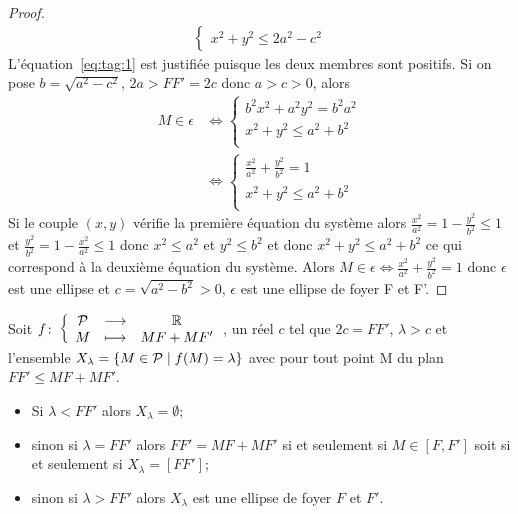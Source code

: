 \begin{proof}
\begin{align}
\begin{cases}
                   x^2+y^2 \leqslant 2a^2 -c^2\end{cases}
  \end{align}
  L'équation~\eqref{eq:tag:1} est justifiée puisque les deux membres sont 
  positifs. Si on  pose \(b=\sqrt{a^2-c^2}\), \(2a>FF'=2c\) donc \(a>c>0\), 
  alors
  \begin{align}
    M \in \epsilon & \iff \begin{cases} b^2x^2 +a^2y^2=b^2a^2 \\ x^2+y^2 
    \leqslant a^2 +b^2\\\end{cases}\\
                   & \iff \begin{cases} \frac{x^2}{a^2} +\frac{y^2}{b^2}=1\\ 
                   x^2+y^2 \leqslant a^2 +b^2 \\\end{cases}
  \end{align}
  Si le couple \((x,y)\) vérifie la première équation du système alors 
  \(\frac{x^2}{a^2}=1-\frac{y^2}{b^2}\leqslant 1\) et 
  \(\frac{y^2}{b^2}=1-\frac{x^2}{a^2} \leqslant 1\) donc \(x^2 \leqslant a^2\) 
  et \(y^2 \leqslant b^2\) et donc \(x^2+y^2 \leqslant a^2+b^2\) ce qui 
  correspond à la deuxième équation du système.
  Alors \(M \in \epsilon \iff \frac{x^2}{a^2} +\frac{y^2}{b^2}=1\) donc 
  \(\epsilon\) est une ellipse et \(c=\sqrt{a^2-b^2}>0\), \(\epsilon\) est une 
  ellipse de foyer F et F'.
\end{proof}
Soit \(f\colon \left\{\begin{array}{ccc} \mathcal{P} & \longrightarrow &\mathbb{R}\\ M & \longmapsto & MF+MF' \end{array} \right.\), un réel \(c\) tel que \(2c=FF'\), 
\(\lambda>c\) et l'ensemble \(X_\lambda=\left\{M \in \mathcal{P}\mathrel{}\middle|\mathrel{}f(M)=\lambda\right\}\) avec 
pour tout point M du plan \(FF'\leqslant MF+MF'\).
\begin{itemize}
  \item Si \(\lambda < FF'\) alors \(X_\lambda=\emptyset\);
  \item sinon si \(\lambda=FF'\) alors \(FF'=MF+MF'\) si et seulement si \(M 
    \in [F,F']\) soit si et seulement si \(X_\lambda=[FF']\);
  \item sinon si \(\lambda >FF'\) alors \(X_\lambda\) est une ellipse de foyer 
    \(F\) et \(F'\).
\end{itemize}

